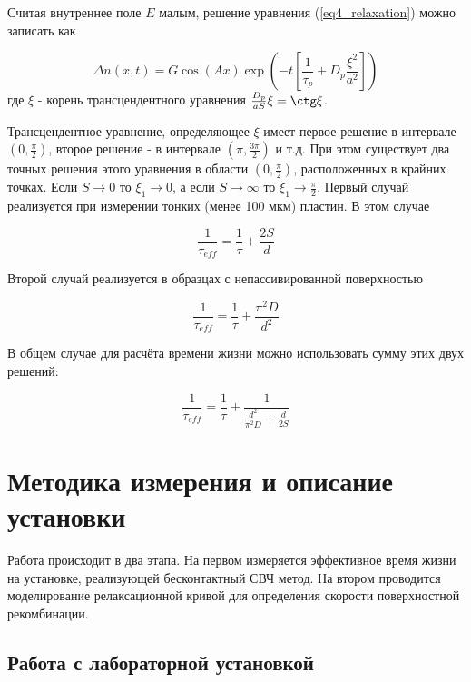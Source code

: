 Считая внутреннее поле $E$ малым, решение уравнения (\ref{eq4_relaxation}) можно записать как

\begin{equation}
\Delta n(x,t) = G \cos(A x) \exp \left( -t \left[ \frac{1}{\tau_{p}} + D_{p} \frac{\xi^2}{a^2} \right] \right)
\end{equation}
где $\xi$ - корень трансцендентного уравнения $\frac{D_{p}}{a S} \xi = \ctg \xi$.

Трансцендентное уравнение, определяющее $\xi$ имеет первое решение в интервале $\left( 0, \frac{\pi}{2} \right)$, второе решение - в интервале $\left( \pi, \frac{3 \pi}{2} \right)$ и т.д. При этом существует два точных решения этого уравнения в области $\left( 0, \frac{\pi}{2} \right)$, расположенных в крайних точках. Если $S \rightarrow 0$ то $\xi_{1} \rightarrow 0$, а если $S \rightarrow \infty$ то $\xi_{1} \rightarrow \frac{\pi}{2}$. Первый случай реализуется при измерении тонких (менее 100 мкм) пластин. В этом случае

\begin{equation}
\frac{1}{\tau_{eff}} = \frac{1}{\tau} + \frac{2 S}{d}
\end{equation}

Второй случай реализуется в образцах с непассивированной поверхностью

\begin{equation}
\frac{1}{\tau_{eff}} = \frac{1}{\tau} + \frac{\pi^2 D}{d^2}
\end{equation}

В общем случае для расчёта времени жизни можно использовать сумму этих двух решений:

\begin{equation}
\frac{1}{\tau_{eff}} = \frac{1}{\tau} + \frac{1}{\frac{d^2}{\pi^2 D} + \frac{d}{2 S}}
\label{eq4_pavelka}
\end{equation}

\section{Методика измерения и описание установки}

Работа происходит в два этапа. На первом измеряется эффективное время жизни на установке, реализующей бесконтактный СВЧ метод. На втором проводится моделирование релаксационной кривой для определения скорости поверхностной рекомбинации.

\subsection{Работа с лабораторной установкой}

